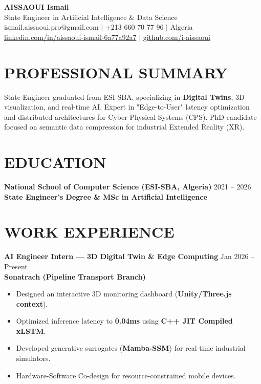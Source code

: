 \documentclass[a4paper,11pt]{article}
\begin{document}
\begin{center}
    {\Huge\bfseries\color{titleblue} AISSAOUI Ismail}\\[4pt]
    {\Large State Engineer in Artificial Intelligence \& Data Science}\\[6pt]
    ismail.aissaoui.pro@gmail.com $|$ +213 660 70 77 96 $|$ Algeria \\
    \href{https://linkedin.com/in/aissaoui-ismail-6a77a92a7}{linkedin.com/in/aissaoui-ismail-6a77a92a7} $|$ \href{https://github.com/i-aissaoui}{github.com/i-aissaoui}
\end{center}

\section{PROFESSIONAL SUMMARY}
State Engineer graduated from ESI-SBA, specializing in \textbf{Digital Twins}, 3D visualization, and real-time AI. Expert in "Edge-to-User" latency optimization and distributed architectures for Cyber-Physical Systems (CPS). PhD candidate focused on semantic data compression for industrial Extended Reality (XR).

\section{EDUCATION}
\textbf{National School of Computer Science (ESI-SBA, Algeria)} \hfill 2021 -- 2026 \\
\textbf{State Engineer's Degree \& MSc in Artificial Intelligence}

\section{WORK EXPERIENCE}
\textbf{AI Engineer Intern — 3D Digital Twin & Edge Computing} \hfill Jan 2026 -- Present \\
\textbf{Sonatrach (Pipeline Transport Branch)} \\
\begin{itemize}
    \item Designed an interactive 3D monitoring dashboard (\textbf{Unity/Three.js context}).
    \item Optimized inference latency to \textbf{0.04ms} using \textbf{C++ JIT Compiled xLSTM}.
    \item Developed generative surrogates (\textbf{Mamba-SSM}) for real-time industrial simulators.
    \item Hardware-Software Co-design for resource-constrained mobile devices.
\end{itemize}
\end{document}
